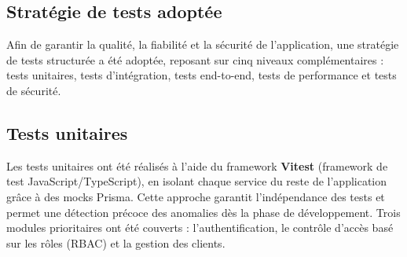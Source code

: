 \subsection{Stratégie de tests adoptée}
Afin de garantir la qualité, la fiabilité et la sécurité de l'application, 
une stratégie de tests structurée a été adoptée, reposant sur cinq niveaux 
complémentaires : tests unitaires, tests d'intégration, tests end-to-end, 
tests de performance et tests de sécurité.

\subsection{Tests unitaires}
\label{sec:tests_unitaires}

Les tests unitaires ont été réalisés à l'aide du framework \textbf{Vitest} (framework de test JavaScript/TypeScript),
en isolant chaque service du reste de l'application grâce à des mocks
Prisma. Cette approche garantit l'indépendance des tests et permet une
détection précoce des anomalies dès la phase de développement. Trois
modules prioritaires ont été couverts : l'authentification, le contrôle
d'accès basé sur les rôles (RBAC) et la gestion des clients.

